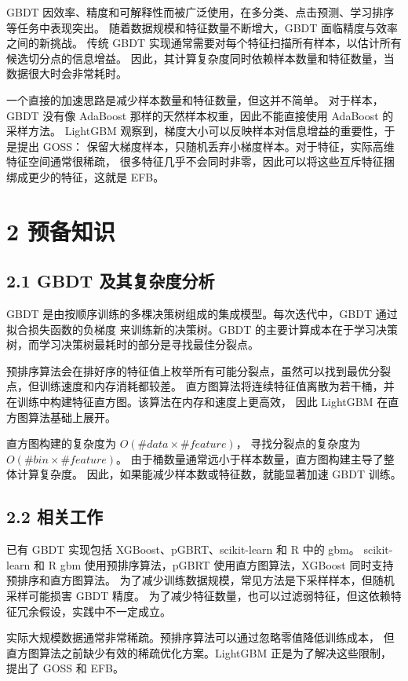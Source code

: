 GBDT 因效率、精度和可解释性而被广泛使用，在多分类、点击预测、学习排序等任务中表现突出。
随着数据规模和特征数量不断增大，GBDT 面临精度与效率之间的新挑战。
传统 GBDT 实现通常需要对每个特征扫描所有样本，以估计所有候选切分点的信息增益。
因此，其计算复杂度同时依赖样本数量和特征数量，当数据很大时会非常耗时。

一个直接的加速思路是减少样本数量和特征数量，但这并不简单。
对于样本，GBDT 没有像 AdaBoost 那样的天然样本权重，因此不能直接使用 AdaBoost 的采样方法。
LightGBM 观察到，梯度大小可以反映样本对信息增益的重要性，于是提出 GOSS：
保留大梯度样本，只随机丢弃小梯度样本。对于特征，实际高维特征空间通常很稀疏，
很多特征几乎不会同时非零，因此可以将这些互斥特征捆绑成更少的特征，这就是 EFB。

\section{2 预备知识}

\subsection{2.1 GBDT 及其复杂度分析}

GBDT 是由按顺序训练的多棵决策树组成的集成模型。每次迭代中，GBDT 通过拟合损失函数的负梯度
来训练新的决策树。GBDT 的主要计算成本在于学习决策树，而学习决策树最耗时的部分是寻找最佳分裂点。

预排序算法会在排好序的特征值上枚举所有可能分裂点，虽然可以找到最优分裂点，但训练速度和内存消耗都较差。
直方图算法将连续特征值离散为若干桶，并在训练中构建特征直方图。该算法在内存和速度上更高效，
因此 LightGBM 在直方图算法基础上展开。

直方图构建的复杂度为 $O(\#data\times \#feature)$，
寻找分裂点的复杂度为 $O(\#bin\times \#feature)$。
由于桶数量通常远小于样本数量，直方图构建主导了整体计算复杂度。
因此，如果能减少样本数或特征数，就能显著加速 GBDT 训练。

\subsection{2.2 相关工作}

已有 GBDT 实现包括 XGBoost、pGBRT、scikit-learn 和 R 中的 gbm。
scikit-learn 和 R gbm 使用预排序算法，pGBRT 使用直方图算法，XGBoost 同时支持预排序和直方图算法。
为了减少训练数据规模，常见方法是下采样样本，但随机采样可能损害 GBDT 精度。
为了减少特征数量，也可以过滤弱特征，但这依赖特征冗余假设，实践中不一定成立。

实际大规模数据通常非常稀疏。预排序算法可以通过忽略零值降低训练成本，
但直方图算法之前缺少有效的稀疏优化方案。LightGBM 正是为了解决这些限制，提出了 GOSS 和 EFB。

